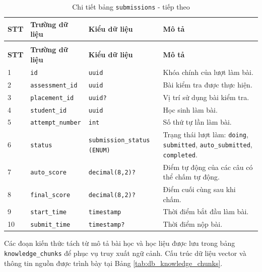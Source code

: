 \documentclass[../DoAn.tex]{subfiles}
\begin{document}
{\begin{longtable}{|p{}|p{}|p{}|p{}|}
\caption{Chi tiết bảng \texttt{submissions}}
\label{tab:db_submissions}\\
\hline
\textbf{STT} & \textbf{Trường dữ liệu} & \textbf{Kiểu dữ liệu} & \textbf{Mô tả} \\ \hline
\endfirsthead
\caption[]{Chi tiết bảng \texttt{submissions} - tiếp theo}\\
\hline
\textbf{STT} & \textbf{Trường dữ liệu} & \textbf{Kiểu dữ liệu} & \textbf{Mô tả} \\ \hline
\endhead
1 & \texttt{id} & \texttt{uuid} & Khóa chính của lượt làm bài. \\ \hline
2 & \texttt{assessment\_id} & \texttt{uuid} & Bài kiểm tra được thực hiện. \\ \hline
3 & \texttt{placement\_id} & \texttt{uuid?} & Vị trí sử dụng bài kiểm tra. \\ \hline
4 & \texttt{student\_id} & \texttt{uuid} & Học sinh làm bài. \\ \hline
5 & \texttt{attempt\_number} & \texttt{int} & Số thứ tự lần làm bài. \\ \hline
6 & \texttt{status} & \texttt{submission\_status (ENUM)} & Trạng thái lượt làm: \texttt{doing}, \texttt{submitted}, \texttt{auto\_submitted}, \texttt{completed}. \\ \hline
7 & \texttt{auto\_score} & \texttt{decimal(8,2)?} & Điểm tự động của các câu có thể chấm tự động. \\ \hline
8 & \texttt{final\_score} & \texttt{decimal(8,2)?} & Điểm cuối cùng sau khi chấm. \\ \hline
9 & \texttt{start\_time} & \texttt{timestamp} & Thời điểm bắt đầu làm bài. \\ \hline
10 & \texttt{submit\_time} & \texttt{timestamp?} & Thời điểm nộp bài. \\ \hline
\end{longtable}

Các đoạn kiến thức tách từ mô tả bài học và học liệu được lưu trong bảng \texttt{knowledge\_chunks} để phục vụ truy xuất ngữ cảnh. Cấu trúc dữ liệu vector và thông tin nguồn được trình bày tại Bảng \ref{tab:db_knowledge_chunks}.

}
\end{document}
